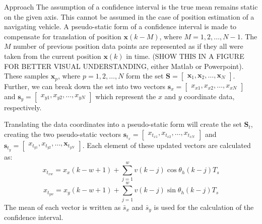 \begin{section}{Approach}
The assumption of a confidence interval is the true mean remains static on the given axis. This cannot be assumed in the case of position estimation of a navigating vehicle. A pseudo-static form of a confidence interval is made to compensate for translation of position $\bm{x}(k-M)$, where $M=1,2,\dots,N-1$. The $M$ number of previous position data points are represented as if they all were taken from the current position $\bm{x}(k)$ in time. (SHOW THIS IN A FIGURE FOR BETTER VISUAL UNDERSTANDING, either Matlab or Powerpoint). These samples $\bm{x}_p$, where $p=1,2,\dots,N$ form the set $\mathcal{\bm{S}}=\begin{bmatrix}\bm{x}_1,\bm{x}_2,\dots,\bm{x}_N \end{bmatrix}$. Further, we can break down the set into two vectors $\bm{s}_x=\begin{bmatrix} x_{x1},x_{x2},\dots,x_{xN} \end{bmatrix}$ and $\bm{s}_y=\begin{bmatrix} x_{y1},x_{y2},\dots,x_{yN} \end{bmatrix}$ which represent the $x$ and $y$ coordinate data, respectively. 

Translating the data coordinates into a pseudo-static form will create the set $\mathcal{\bm{S}}_t$, creating the two pseudo-static vectors $\bm{s}_{t_x}=\begin{bmatrix} x_{t_{x1}},x_{t_{x2}},\dots,x_{t_{xN}} \end{bmatrix}$ and $\bm{s}_{t_y}=\begin{bmatrix} x_{t_{y1}},x_{t_{y2}},\dots,\bm{x}_{t_{yN}} \end{bmatrix}$. Each element of these updated vectors are calculated as:
    \begin{equation}
	x_{t_{xw}} = x_x(k-w+1)+\sum_{j=1}^w v(k-j)\cos{\theta_h(k-j)T_s}
	\end{equation}
	\begin{equation}
	x_{t_{yw}} = x_y(k-w+1)+\sum_{j=1}^w v(k-j)\sin{\theta_h(k-j)T_s}
	\end{equation}
The mean of each vector is written as $\bar{s}_x$ and $\bar{s}_y$ is used for the calculation of the confidence interval.


\end{section}
